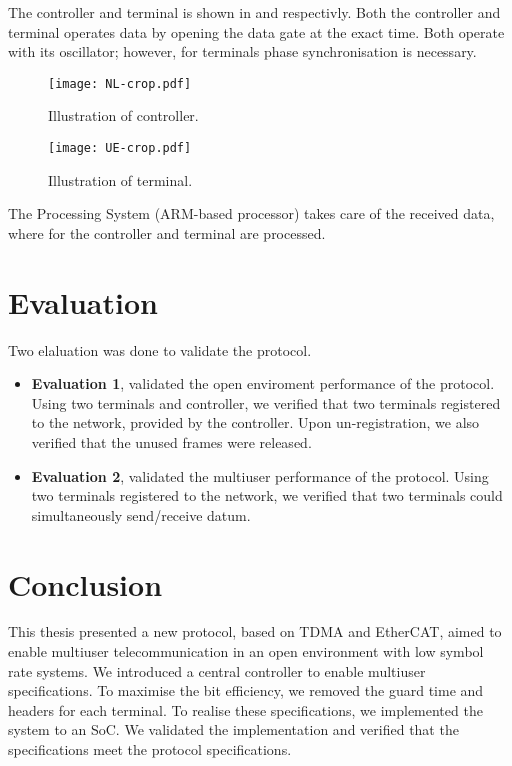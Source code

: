 ﻿\documentclass[twocolumn,9pt]{ltjsarticle}
\renewcommand{\ref}{\Cref}
\begin{document}
The controller and terminal is shown in \ref{fig:controller} and \ref{fig:terminal} respectivly.
Both the controller and terminal operates data by opening the data gate at the exact time.
Both operate with its oscillator; however, for terminals phase synchronisation is necessary.

\begin{figure}[tb]
  \centering
  \texttt{[image: NL-crop.pdf]}
  \caption{\label{fig:controller}
    Illustration of controller.
  }
\end{figure}

\begin{figure}[tb]
  \centering
  \texttt{[image: UE-crop.pdf]}
  \caption{\label{fig:terminal}
    Illustration of terminal.
  }
\end{figure}

The Processing System (ARM\textregistered -based processor) takes care of the received data, where for the controller and terminal are processed.

\section{Evaluation}
Two elaluation was done to validate the protocol.
\begin{itemize}
\item \textbf{Evaluation 1}, validated the open enviroment performance of the protocol.
  Using two terminals and controller, we verified that two terminals registered to the network, provided by the controller.
  Upon un-registration, we also verified that the unused frames were released.
\item \textbf{Evaluation 2}, validated the multiuser performance of the protocol.
  Using two terminals registered to the network, we verified that two terminals could simultaneously send/receive datum.
\end{itemize}

\section{Conclusion}
This thesis presented a new protocol, based on TDMA and EtherCAT, aimed to enable multiuser telecommunication in an open environment with low symbol rate systems.
We introduced a central controller to enable multiuser specifications.
To maximise the bit efficiency, we removed the guard time and headers for each terminal.
To realise these specifications, we implemented the system to an SoC.
We validated the implementation and verified that the specifications meet the protocol specifications.
\end{document}
